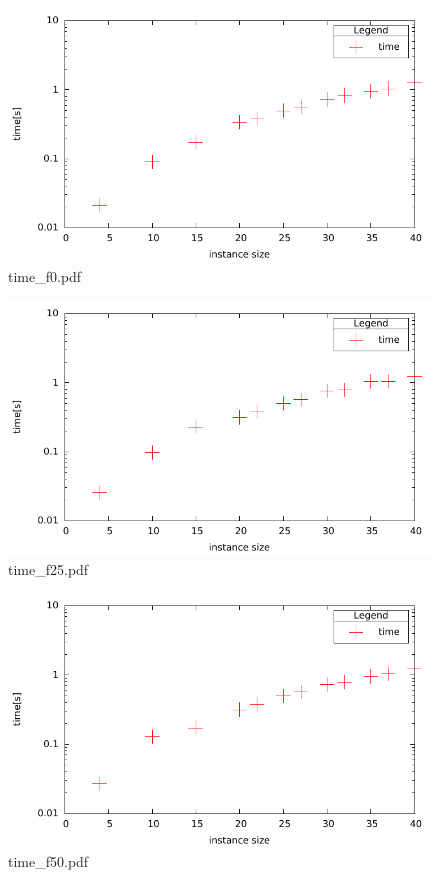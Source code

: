 \documentclass[12pt,a4paper]{article}
\begin{document}
\begin{figure}[H]
\caption{time\_f0.pdf }
\includegraphics{./time_f0.pdf}
\end{figure}

\begin{figure}[H]
\caption{time\_f25.pdf }
\includegraphics{./time_f25.pdf}
\end{figure}

\begin{figure}[H]
\caption{time\_f50.pdf }
\includegraphics{./time_f50.pdf}
\end{figure}
\end{document}
